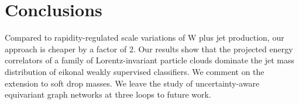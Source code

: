 \section{Conclusions}\label{sec:conclusions}

Compared to rapidity-regulated scale variations of W plus jet
production, our approach is cheaper by a factor of 2. Our results show
that the projected energy correlators of a family of Lorentz-invariant
particle clouds dominate the jet mass distribution of eikonal weakly
supervised classifiers. We comment on the extension to soft drop masses.
We leave the study of uncertainty-aware equivariant graph networks at
three loops to future work.


